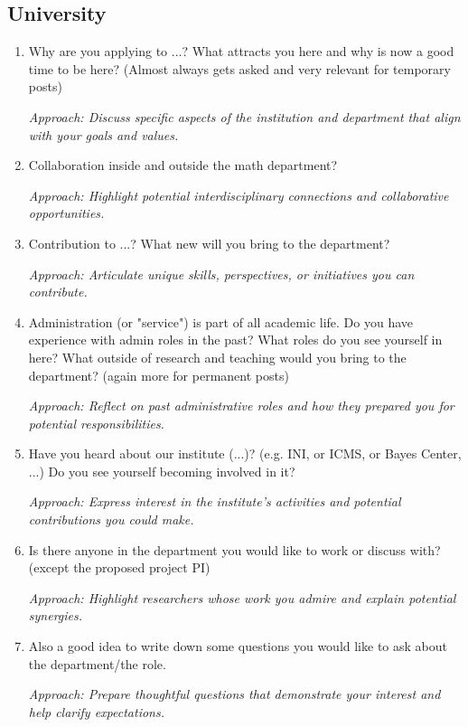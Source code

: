 \documentclass[12pt]{article}
\numberwithin{equation}{section}
\begin{document}
\subsection{University}
\begin{enumerate}
    \item Why are you applying to ...? What attracts you here and why is now a good time to be here? (Almost always gets asked and very relevant for temporary posts)
    
    \textit{Approach: Discuss specific aspects of the institution and department that align with your goals and values.}

    \item Collaboration inside and outside the math department?
    
    \textit{Approach: Highlight potential interdisciplinary connections and collaborative opportunities.}

    \item Contribution to ...? What new will you bring to the department?
    
    \textit{Approach: Articulate unique skills, perspectives, or initiatives you can contribute.}

    \item Administration (or "service") is part of all academic life. Do you have experience with admin roles in the past? What roles do you see yourself in here? What outside of research and teaching would you bring to the department? (again more for permanent posts)
    
    \textit{Approach: Reflect on past administrative roles and how they prepared you for potential responsibilities.}

    \item Have you heard about our institute (...)? (e.g. INI, or ICMS, or Bayes Center, ...) Do you see yourself becoming involved in it?
    
    \textit{Approach: Express interest in the institute’s activities and potential contributions you could make.}

    \item Is there anyone in the department you would like to work or discuss with? (except the proposed project PI)
    
    \textit{Approach: Highlight researchers whose work you admire and explain potential synergies.}

    \item Also a good idea to write down some questions you would like to ask about the department/the role.
    
    \textit{Approach: Prepare thoughtful questions that demonstrate your interest and help clarify expectations.}
\end{enumerate}
\end{document}
